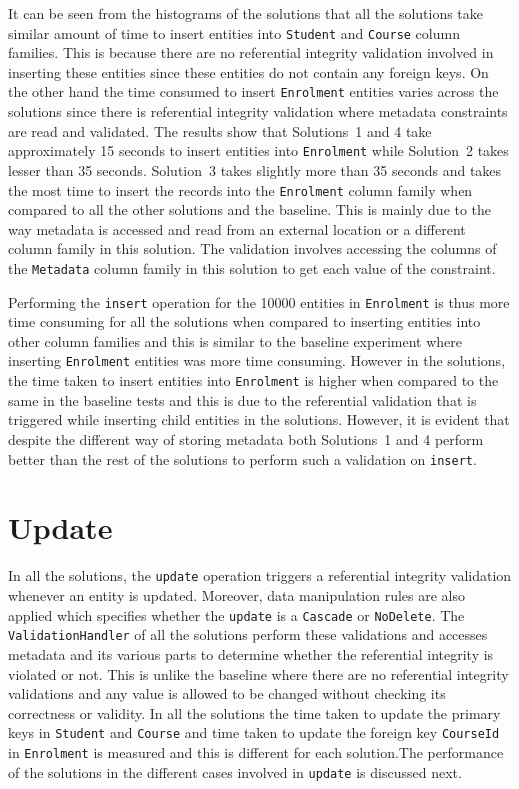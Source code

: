 It can be seen from the histograms of the solutions that all the solutions take
similar amount of time to insert entities into \texttt{Student} and
\texttt{Course} column families. This is because there are no referential
integrity validation involved in inserting these entities since these entities
do not contain any foreign keys. On the other hand the time consumed to insert
\texttt{Enrolment} entities varies across the solutions since there is
referential integrity validation where metadata constraints are read and
validated.
The results show that Solutions~1 and 4 take approximately 15 seconds to insert
entities into \texttt{Enrolment} while Solution~2 takes lesser than 35 seconds. Solution~3
takes slightly more than 35 seconds and takes the most time to insert the
records into the \texttt{Enrolment} column family when compared to all the other
solutions and the baseline. This is mainly due to the way metadata is accessed
and read from an external location or a different column family in this
solution. The validation involves accessing the  columns of the
\texttt{Metadata} column family in this solution to get each value of the
constraint.
		
Performing the \texttt{insert} operation for the 10000 entities in
\texttt{Enrolment} is thus more time consuming for all the solutions when
compared to inserting entities into other column families and this is similar to
the baseline experiment where inserting \texttt{Enrolment} entities was more
time consuming.
However in the solutions, the time taken to insert entities into
\texttt{Enrolment} is higher when compared to the same in the baseline tests and
this is  due to the referential validation that is triggered while inserting
child entities in the solutions. However, it is evident that despite the
different way of storing metadata both Solutions~1 and 4 perform better than the
rest of the solutions to perform such a validation on \texttt{insert}.

\newpage
\section{Update}\label{sr:update}
In all the solutions, the \texttt{update} operation triggers a referential
integrity validation whenever an entity is updated. Moreover, data manipulation
rules are also applied which specifies whether the \texttt{update} is a
\texttt{Cascade} or \texttt{NoDelete}. The \texttt{ValidationHandler} of all the
solutions perform these validations and accesses metadata and its various parts
to determine whether the referential integrity is violated or not. This is
unlike the baseline where there are no referential integrity validations and any
value is allowed to be changed without checking its correctness or validity. In
all the solutions the time taken to update the primary keys in \texttt{Student}
and \texttt{Course} and time taken to update the foreign key \texttt{CourseId}
in \texttt{Enrolment} is measured and this is different for each solution.The
performance of the solutions in the different cases involved in \texttt{update}
is discussed next.

